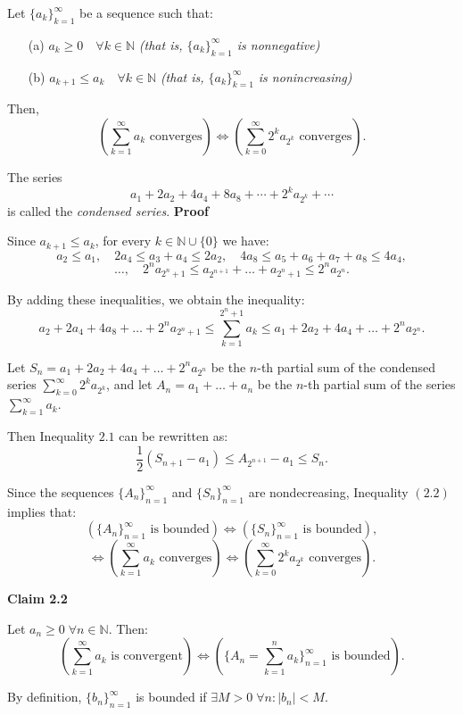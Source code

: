 Let $\{a_k\}_{k=1}^\infty$ be a sequence such that:
\begin{itemize}
    \item[(a)] $a_k \geq 0 \quad \forall k \in \mathbb{N}$ \hfill \textit{(that is, $\{a_k\}_{k=1}^\infty$ is nonnegative)}
    \item[(b)] $a_{k+1} \leq a_k \quad \forall k \in \mathbb{N}$ \hfill \textit{(that is, $\{a_k\}_{k=1}^\infty$ is nonincreasing)}
\end{itemize}

Then,
\[
\left( \sum_{k=1}^\infty a_k \text{ converges} \right) \iff \left( \sum_{k=0}^\infty 2^k a_{2^k} \text{ converges} \right).
\]

The series 
\[
a_1 + 2a_2 + 4a_4 + 8a_8 + \cdots + 2^k a_{2^k} + \cdots
\]
is called the \emph{condensed series}.
\textbf{Proof}

Since $a_{k+1} \leq a_k$, for every $k \in \mathbb{N} \cup \{0\}$ we have:
\[
a_2 \leq a_1, \quad 2a_4 \leq a_3 + a_4 \leq 2a_2, \quad 4a_8 \leq a_5 + a_6 + a_7 + a_8 \leq 4a_4,
\]
\[
\ldots, \quad 2^n a_{2^n+1} \leq a_{2^{n+1}} + \ldots + a_{2^n+1} \leq 2^n a_{2^n}.
\]

By adding these inequalities, we obtain the inequality:
\[
a_2 + 2a_4 + 4a_8 + \ldots + 2^n a_{2^n+1} \leq \sum_{k=1}^{2^n+1} a_k \leq a_1 + 2a_2 + 4a_4 + \ldots + 2^n a_{2^n}.
\]

Let $S_n = a_1 + 2a_2 + 4a_4 + \ldots + 2^n a_{2^n}$ be the $n$-th partial sum of the condensed series $\sum_{k=0}^\infty 2^k a_{2^k}$, and let $A_n = a_1 + \ldots + a_n$ be the $n$-th partial sum of the series $\sum_{k=1}^\infty a_k$.

Then Inequality $2.1$ can be rewritten as:
\[
\frac{1}{2}(S_{n+1} - a_1) \leq A_{2^{n+1}} - a_1 \leq S_n. \tag{2.2}
\]

Since the sequences $\{A_n\}_{n=1}^\infty$ and $\{S_n\}_{n=1}^\infty$ are nondecreasing, Inequality $(2.2)$ implies that:
\[
\left(\{A_n\}_{n=1}^\infty \text{ is bounded}\right) \iff \left(\{S_n\}_{n=1}^\infty \text{ is bounded}\right),
\]
\[
\iff \left(\sum_{k=1}^\infty a_k \text{ converges}\right) \iff \left(\sum_{k=0}^\infty 2^k a_{2^k} \text{ converges}\right).
\]

\textbf{Claim 2.2}

Let $a_n \geq 0 \; \forall n \in \mathbb{N}$. Then:
\[
\left( \sum_{k=1}^\infty a_k \text{ is convergent} \right) \iff \left( \{A_n = \sum_{k=1}^n a_k\}_{n=1}^\infty \text{ is bounded} \right).
\]

By definition, $\{b_n\}_{n=1}^\infty$ is bounded if $\exists M > 0 \; \forall n : |b_n| < M$.

